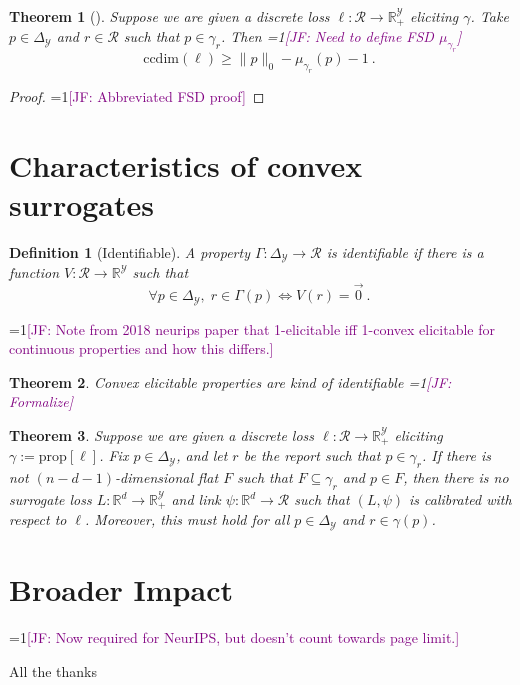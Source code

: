 \documentclass{article}
\newcommand{\Comments}{1}
\newcommand{\mynote}[2]{\ifnum\Comments=1\textcolor{#1}{#2}\fi}
\newcommand{\jessie}[1]{\mynote{purple}{[JF: #1]}}
\newcommand{\reals}{\mathbb{R}}
\newcommand{\simplex}{\Delta_\Y}
\newcommand{\prop}[1]{\mathrm{prop}[#1]}
\newcommand{\ccdim}{\mathrm{ccdim}}
\newcommand{\R}{\mathcal{R}}
\newcommand{\Y}{\mathcal{Y}}
\newtheorem{theorem}{Theorem}
\newtheorem{definition}{Definition}
\begin{document}
\begin{theorem}[\cite{ramaswamy2016convex}]
	Suppose we are given a discrete loss $\ell:\R \to \reals^\Y_+$ eliciting $\gamma$.
	Take $p \in \simplex$ and $r \in \R$ such that $p \in \gamma_r$.
	Then \jessie{Need to define FSD $\mu_{\gamma_r}$}
	\begin{equation}
	\ccdim(\ell) \geq \|p\|_0 - \mu_{\gamma_r}(p) - 1~.~
	\end{equation}
\end{theorem}
\begin{proof}
	\jessie{Abbreviated FSD proof}
\end{proof}

\section{Characteristics of convex surrogates }
\begin{definition}[Identifiable]
	A property $\Gamma: \simplex \to \R$ is \emph{identifiable} if there is a function $V: \R \to \reals^\Y$ such that 
	\begin{equation*}
	\forall p \in \simplex, \; r \in \Gamma(p) \iff V(r) = \vec 0~.~
	\end{equation*}
\end{definition}

\jessie{Note from 2018 neurips paper that 1-elicitable iff 1-convex elicitable for continuous properties and how this differs.}

\begin{theorem}
	Convex elicitable properties are kind of identifiable \jessie{Formalize}
\end{theorem}

\begin{theorem}
	Suppose we are given a discrete loss $\ell:\R \to \reals^\Y_+$ eliciting $\gamma:= \prop{\ell}$.
	Fix $p \in \simplex$, and let $r$ be the report such that $p \in \gamma_r$.  
	If there is not $(n - d - 1)$-dimensional flat $F$ such that $F \subseteq \gamma_r$ and $p \in F$, then there is no surrogate loss $L : \reals^d \to \reals^\Y_+$ and link $\psi:\reals^d \to \R$ such that $(L, \psi)$ is calibrated with respect to $\ell$.
	Moreover, this must hold for all $p \in \simplex$ and $r \in \gamma(p)$.
\end{theorem}



\section*{Broader Impact}
\jessie{Now required for NeurIPS, but doesn't count towards page limit.}

\begin{ack}
All the thanks
\end{ack}



\end{document}
